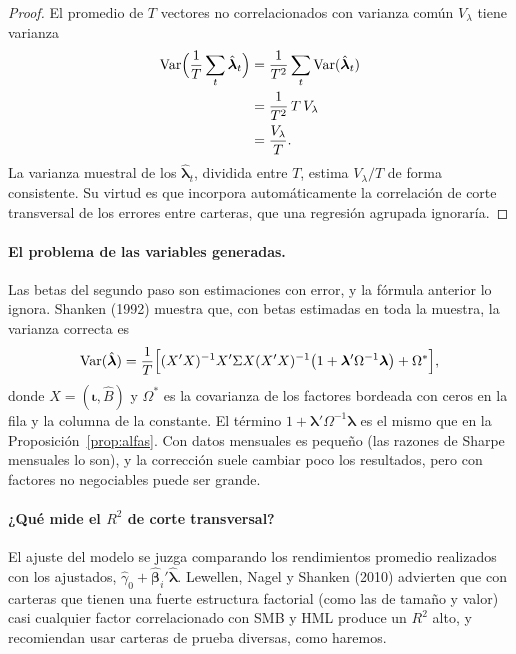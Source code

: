 \begin{proof}
El promedio de $T$ vectores no correlacionados con varianza común $V_\lambda$ tiene varianza
\begin{align*}
  \operatorname{Var}\Bigl(\frac1T\sum_t\hat{\boldsymbol\lambda}_t\Bigr) &= \frac{1}{T^2}\sum_t\operatorname{Var}(\hat{\boldsymbol\lambda}_t)\\
                                                         &= \frac{1}{T^2}\,T\,V_\lambda\\
                                                         &= \frac{V_\lambda}{T}.
\end{align*}
La varianza muestral de los $\hat{\boldsymbol\lambda}_t$, dividida entre $T$, estima $V_\lambda/T$ de forma consistente. Su
virtud es que incorpora automáticamente la correlación de corte transversal de los errores entre carteras, que una
regresión agrupada ignoraría.
\end{proof}

\paragraph{El problema de las variables generadas.} Las betas del segundo paso son estimaciones con error, y la fórmula
anterior lo ignora. Shanken (1992) muestra que, con betas estimadas en toda la muestra, la varianza correcta es
\[
  \operatorname{Var}(\hat{\boldsymbol\lambda})=\frac1T\Bigl[(X'X)^{-1}X'\Sigma X(X'X)^{-1}\bigl(1+\boldsymbol\lambda'\Omega^{-1}\boldsymbol\lambda\bigr)+\Omega^*\Bigr],
\]
donde $X=(\boldsymbol\iota,\hat B)$ y $\Omega^*$ es la covarianza de los factores bordeada con ceros en la fila y la
columna de la constante. El término $1+\boldsymbol\lambda'\Omega^{-1}\boldsymbol\lambda$ es el mismo que en la
Proposición~\ref{prop:alfas}. Con datos mensuales es pequeño (las razones de Sharpe mensuales lo son), y la corrección
suele cambiar poco los resultados, pero con factores no negociables puede ser grande.

\paragraph{¿Qué mide el $R^2$ de corte transversal?} El ajuste del modelo se juzga comparando los rendimientos promedio
realizados con los ajustados, $\hat\gamma_0+\hat{\boldsymbol\beta}_i'\hat{\boldsymbol\lambda}$. Lewellen, Nagel y Shanken (2010)
advierten que con carteras que tienen una fuerte estructura factorial (como las de tamaño y valor) casi cualquier
factor correlacionado con SMB y HML produce un $R^2$ alto, y recomiendan usar carteras de prueba diversas, como haremos.


